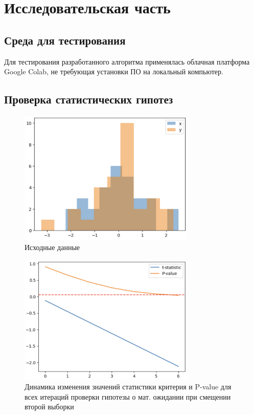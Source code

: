 \chapter{Исследовательская часть}

\section{Среда для тестирования}

Для тестирования разработанного алгоритма применялась облачная платформа Google Colab, не требующая установки ПО на локальный компьютер.

% 

\section{Проверка статистических гипотез}

\begin{figure}
	\begin{center}
		\includegraphics[width=0.75\textwidth]{images/1.png}
	\end{center}
	\caption{Исходные данные}
	\label{img:1}
\end{figure}

\begin{figure}
	\begin{center}
		\includegraphics[width=0.75\textwidth]{images/2.png}
	\end{center}
	\caption{Динамика изменения значений статистики критерия и P-value для всех итераций проверки гипотезы о мат. ожидании при смещении второй выборки}
	\label{img:2}
\end{figure}

